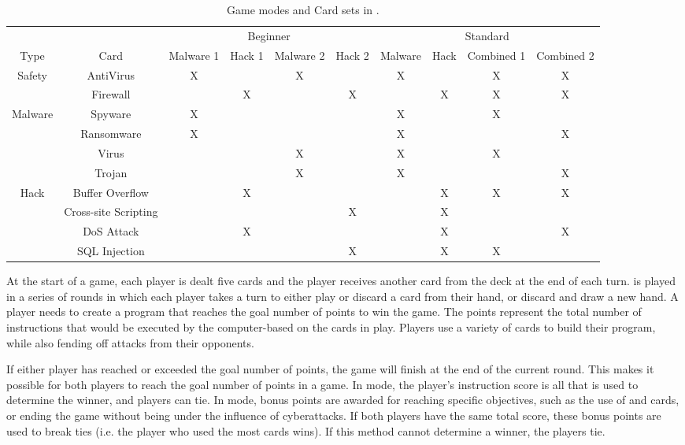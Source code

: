 \begin{table}
	\caption{Game modes and Card sets in \pwTwoNS.}
	\begin{tabular}{|c|c|c|c|c|c|c|c|c|c|}
		\cline{1-10}
		& & \multicolumn{4}{|c|}{Beginner} & \multicolumn{4}{|c|}{Standard} \\ 
		\cline{3-10}
		Type & Card & Malware 1 & Hack 1 & Malware 2 & Hack 2 & Malware & Hack  & Combined 1 & Combined 2 \\ \hline
		\hline
		\multirow{2}{*}{Safety} & AntiVirus 	& X & & X & & X & & X & X \\ \cline{2-10}
		& Firewall 	&  & X &  & X &  & X & X & X \\ \hline \hline
		\multirow{4}{*}{Malware} & Spyware 	& X & & & & X & & X & \\ \cline{2-10}
		& Ransomware 	& X & & & & X & &  & X \\ \cline{2-10}
		& Virus		& & & X & & X & & X &  \\ \cline{2-10}
		& Trojan 		& & & X & & X & &  & X  \\ 
		\hline
		\hline
		\multirow{4}{*}{Hack} & Buffer Overflow 	& & X & & & & X & X & X \\ \cline{2-10}
		& Cross-site Scripting 	& & & & X & & X & & \\ \cline{2-10}
		& DoS Attack		& & X & & & & X & & X \\ \cline{2-10}
		& SQL Injection	& & & & X & & X & X &  \\ 
		\hline 
	\end{tabular}
	\label{table:cardSets}
\end{table}

At the start of a game, each player is dealt five cards and the player receives another card from the deck at the end of each turn. \gameName is played in a series of rounds in which each player takes a turn to either play or discard a card from their hand, or discard and draw a new hand. A player needs to create a program that reaches the goal number of points to win the game. The points represent the total number of instructions that would be executed by the computer-based on the cards in play. Players use a variety of cards to build their program, while also fending off attacks from their opponents.

If either player has reached or exceeded the goal number of points, the game will finish at the end of the current round. This makes it possible for both players to reach the goal number of points in a game. In \B mode, the player's instruction score is all that is used to determine the winner, and players can tie. In \Std mode, bonus points are awarded for reaching specific objectives, such as the use of \R and \V cards, or ending the game without being under the influence of cyberattacks. If both players have the same total score, these bonus points are used to break ties (i.e. the player who used the most \V cards wins). If this method cannot determine a winner, the players tie.

